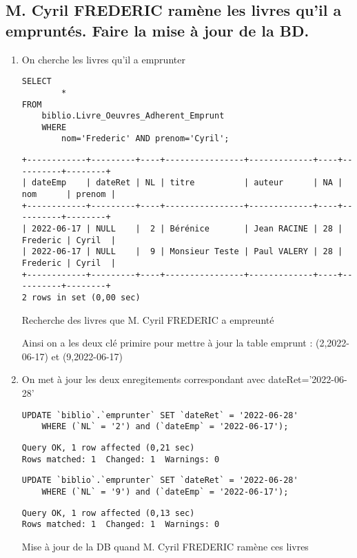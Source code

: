 \documentclass{article}
\begin{document}
\subsection{ M. Cyril FREDERIC ramène les livres qu’il a empruntés. Faire la mise à jour de
	la BD.}
\begin{enumerate}
	\item On cherche les livres qu'il a emprunter
	      \begin{listing}[H]
		      \begin{verbatim}
SELECT 
		*
FROM
	biblio.Livre_Oeuvres_Adherent_Emprunt
	WHERE 
		nom='Frederic' AND prenom='Cyril';
\end{verbatim}
		      \begin{verbatim}
+------------+---------+----+----------------+-------------+----+----------+--------+
| dateEmp    | dateRet | NL | titre          | auteur      | NA | nom      | prenom |
+------------+---------+----+----------------+-------------+----+----------+--------+
| 2022-06-17 | NULL    |  2 | Bérénice       | Jean RACINE | 28 | Frederic | Cyril  |
| 2022-06-17 | NULL    |  9 | Monsieur Teste | Paul VALERY | 28 | Frederic | Cyril  |
+------------+---------+----+----------------+-------------+----+----------+--------+
2 rows in set (0,00 sec)
\end{verbatim}
		      \caption{Recherche des livres que M. Cyril FREDERIC a empreunté}
	      \end{listing}

	      Ainsi on a les deux clé primire pour mettre à jour la table emprunt : (2,2022-06-17) et (9,2022-06-17)

	\item  On met à jour les deux enregitements correspondant avec dateRet='2022-06-28'
	      \begin{listing}[H]
		      \begin{verbatim}
UPDATE `biblio`.`emprunter` SET `dateRet` = '2022-06-28' 
	WHERE (`NL` = '2') and (`dateEmp` = '2022-06-17');
\end{verbatim}
		      \begin{verbatim}
Query OK, 1 row affected (0,21 sec)
Rows matched: 1  Changed: 1  Warnings: 0
\end{verbatim}
		      \begin{verbatim}
UPDATE `biblio`.`emprunter` SET `dateRet` = '2022-06-28' 
	WHERE (`NL` = '9') and (`dateEmp` = '2022-06-17');
\end{verbatim}
		      \begin{verbatim}
Query OK, 1 row affected (0,13 sec)
Rows matched: 1  Changed: 1  Warnings: 0
\end{verbatim}
		      \caption{Mise à jour de la DB quand M. Cyril FREDERIC ramène ces livres}
	      \end{listing}
\end{enumerate}
\end{document}
